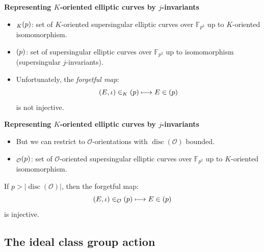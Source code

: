 \documentclass[10pt]{beamer}
\theoremstyle{plain}
\theoremstyle{definition}
\newcommand{\F}{\mathbb{F}}
\newcommand{\mO}{\mathcal{O}}
\renewcommand{\(}{\left(}
\renewcommand{\)}{\right)}
\DeclareMathOperator{\disc}{disc}
\let\SS\relax
\DeclareMathOperator{\SS}{SS}
\begin{document}
\begin{frame}
\textbf{Representing $K$-oriented elliptic curves by $j$-invariants}

\vspace{0.5cm}

\begin{itemize}
\item $\SS_K(p)$: set of $K$-oriented supersingular elliptic curves over $\F_{p^2}$ up to $K$-oriented isomomorphism.
\item $\SS(p)$: set of supersingular elliptic curves over $\F_{p^2}$ up to isomomorphism (supersingular $j$-invariants).
\item Unfortunately, the \emph{forgetful map}:
\[(E,\iota)\in\SS_K(p)\longmapsto E\in\SS(p)\]
is not injective.
\end{itemize}

\end{frame}

\begin{frame}
\textbf{Representing $K$-oriented elliptic curves by $j$-invariants}

\vspace{0.5cm}

\begin{itemize}
\item But we can restrict to $\mO$-orientations with $\disc(\mO)$ bounded.
\item $\SS_{\mO}(p)$: set of $\mO$-oriented supersingular elliptic curves over $\F_{p^2}$ up to $K$-oriented isomomorphism.
\end{itemize}

\begin{theorem}
If $p>|\disc(\mO)|$, then the forgetful map:
\[(E,\iota)\in\SS_{\mO}(p)\longmapsto E\in\SS(p)\]
is injective.
\end{theorem}

\end{frame}

\subsection{The ideal class group action}
\end{document}
